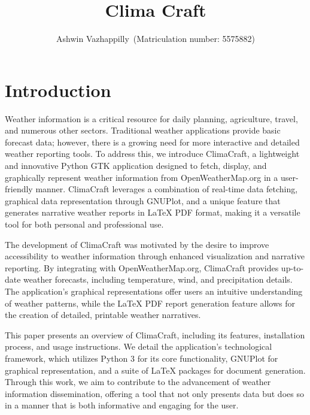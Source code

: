 \documentclass[sn-mathphys-num]{sn-jnl}%
\begin{document}
\title[Clima Craft]{Clima Craft}

\author{Ashwin Vazhappilly\, (Matriculation number: 5575882)}



\maketitle

\section{Introduction}\label{sec1}

Weather information is a critical resource for daily planning, agriculture, travel, and numerous other sectors. Traditional weather applications provide basic forecast data; however, there is a growing need for more interactive and detailed weather reporting tools. To address this, we introduce ClimaCraft, a lightweight and innovative Python GTK application designed to fetch, display, and graphically represent weather information from OpenWeatherMap.org in a user-friendly manner. ClimaCraft leverages a combination of real-time data fetching, graphical data representation through GNUPlot, and a unique feature that generates narrative weather reports in LaTeX PDF format, making it a versatile tool for both personal and professional use.

The development of ClimaCraft was motivated by the desire to improve accessibility to weather information through enhanced visualization and narrative reporting. By integrating with OpenWeatherMap.org, ClimaCraft provides up-to-date weather forecasts, including temperature, wind, and precipitation details. The application's graphical representations offer users an intuitive understanding of weather patterns, while the LaTeX PDF report generation feature allows for the creation of detailed, printable weather narratives.

This paper presents an overview of ClimaCraft, including its features, installation process, and usage instructions. We detail the application's technological framework, which utilizes Python 3 for its core functionality, GNUPlot for graphical representation, and a suite of LaTeX packages for document generation. Through this work, we aim to contribute to the advancement of weather information dissemination, offering a tool that not only presents data but does so in a manner that is both informative and engaging for the user. 
\end{document}
